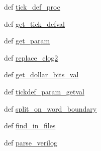 \begin{DoxyCompactItemize}
def \hyperlink{classsrc_1_1verilog__parser_1_1verilog__parser_adbfb593949354e4adfba57e620f37e48}{tick\-\_\-def\-\_\-proc}
\item 
def \hyperlink{classsrc_1_1verilog__parser_1_1verilog__parser_aae3b515116fb91e32af6fc95c796cc2c}{get\-\_\-tick\-\_\-defval}
\item 
def \hyperlink{classsrc_1_1verilog__parser_1_1verilog__parser_ac38cf01d9a31f8d653941b74dbe7cfa2}{get\-\_\-param}
\item 
def \hyperlink{classsrc_1_1verilog__parser_1_1verilog__parser_a21984185944e7ca6cab073280d7ee249}{replace\-\_\-clog2}
\item 
def \hyperlink{classsrc_1_1verilog__parser_1_1verilog__parser_a188246bedacf825272b491e14d8c2ba3}{get\-\_\-dollar\-\_\-bits\-\_\-val}
\item 
def \hyperlink{classsrc_1_1verilog__parser_1_1verilog__parser_a335ab7ed6e9f856a7df251dd34725762}{tickdef\-\_\-param\-\_\-getval}
\item 
def \hyperlink{classsrc_1_1verilog__parser_1_1verilog__parser_a2cce56162afd3054e1a50c226c90e9ee}{split\-\_\-on\-\_\-word\-\_\-boundary}
\item 
def \hyperlink{classsrc_1_1verilog__parser_1_1verilog__parser_a7fed4bff4433384050175e0753d61a00}{find\-\_\-in\-\_\-files}
\item 
def \hyperlink{classsrc_1_1verilog__parser_1_1verilog__parser_a2ed049ecaa016db28e68c585938be4a9}{parse\-\_\-verilog}
\end{DoxyCompactItemize}
